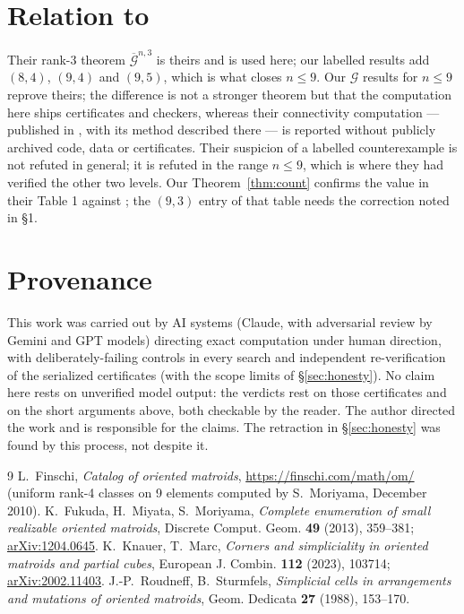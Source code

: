 \documentclass[11pt]{amsart}
\theoremstyle{remark}
\newcommand{\Gb}{\overline{\mathcal{G}}}
\newcommand{\Gm}{\mathcal{G}}
\begin{document}
\section*{Relation to \cite{KM23}}

Their rank-$3$ theorem $\Gb^{n,3}$ is theirs and is used here; our
labelled results add $(8,4)$, $(9,4)$ and $(9,5)$, which is what closes
$n\le 9$. Our $\Gm$ results for $n\le 9$ reprove theirs; the difference
is not a stronger theorem but that the computation here ships
certificates and checkers, whereas their connectivity computation ---
published in \cite{KM23}, with its method described there --- is reported
without publicly archived code, data or certificates. Their suspicion of
a labelled counterexample is not refuted in general; it is refuted in the
range $n\le 9$, which is where they had verified the other two levels.
Our Theorem~\ref{thm:count} confirms the value in their Table 1 against
\cite{FMM13}; the $(9,3)$ entry of that table needs the correction noted
in \S1.

\section*{Provenance}

This work was carried out by AI systems (Claude, with adversarial review
by Gemini and GPT models) directing exact computation under human
direction, with deliberately-failing controls in every search and
independent re-verification of the serialized certificates (with the
scope limits of \S\ref{sec:honesty}). No claim here rests on unverified
model output: the verdicts rest on those certificates and on the short
arguments above, both checkable by the reader. The author
directed the work and is responsible for the claims. The retraction in
\S\ref{sec:honesty} was found by this process, not despite it.

\begin{thebibliography}{9}
 L.~Finschi, \emph{Catalog of oriented matroids},
  \url{https://finschi.com/math/om/} (uniform rank-4 classes on 9
  elements computed by S.~Moriyama, December 2010).
 K.~Fukuda, H.~Miyata, S.~Moriyama,
  \emph{Complete enumeration of small realizable oriented matroids},
  Discrete Comput. Geom. \textbf{49} (2013), 359--381;
  \href{https://arxiv.org/abs/1204.0645}{arXiv:1204.0645}.
 K.~Knauer, T.~Marc, \emph{Corners and simpliciality in
  oriented matroids and partial cubes}, European J. Combin. \textbf{112}
  (2023), 103714; \href{https://arxiv.org/abs/2002.11403}{arXiv:2002.11403}.
 J.-P.~Roudneff, B.~Sturmfels, \emph{Simplicial cells in
  arrangements and mutations of oriented matroids},
  Geom. Dedicata \textbf{27} (1988), 153--170.
\end{thebibliography}
\end{document}
